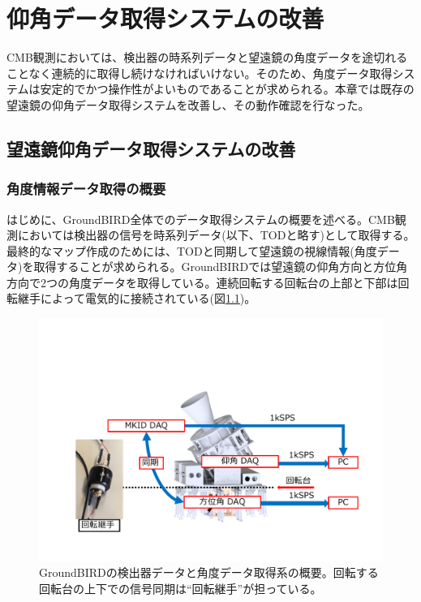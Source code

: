 \chapter{仰角データ取得システムの改善}
\label{chapter3}

CMB観測においては、検出器の時系列データと望遠鏡の角度データを途切れることなく連続的に取得し続けなければいけない。そのため、角度データ取得システムは安定的でかつ操作性がよいものであることが求められる。本章では既存の望遠鏡の仰角データ取得システムを改善し、その動作確認を行なった。
\section{望遠鏡仰角データ取得システムの改善}

\subsection{角度情報データ取得の概要}
はじめに、GroundBIRD全体でのデータ取得システムの概要を述べる。CMB観測においては検出器の信号を時系列データ(以下、TODと略す)として取得する。最終的なマップ作成のためには、TODと同期して望遠鏡の視線情報(角度データ)を取得することが求められる。GroundBIRDでは望遠鏡の仰角方向と方位角方向で2つの角度データを取得している。連続回転する回転台の上部と下部は回転継手\cite{rotary_joint}によって電気的に接続されている(図\ref{GB_daq})。

\begin{figure}[htbp]
  \centering
  \includegraphics[width=1.0\columnwidth]{4_elDAQ/figs/GB_DAQ_mod4.pdf}
  \caption{GroundBIRDの検出器データと角度データ取得系の概要。回転する回転台の上下での信号同期は``回転継手''が担っている。}
  \label{GB_daq}
\end{figure}


